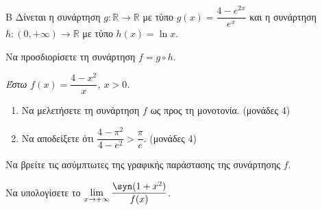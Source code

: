 \begin{thema}{Β}
Δίνεται η συνάρτηση $g: \mathbb{R} \to \mathbb{R}$ με τύπο $g(x) = \dfrac{4 - e^{2x}}{e^x}$ και η συνάρτηση $h: (0, +\infty) \to \mathbb{R}$ με τύπο $h(x) = \ln x$.
\begin{erwthma}
    \item Να προσδιορίσετε τη συνάρτηση $f = g \circ h$. 

    \item[\phantom{Β0.}] \textit{Έστω $f(x) = \dfrac{4 - x^2}{x}$, $x > 0$.}

    \item
    \begin{enumerate}[label=\roman*)]
        \item Να μελετήσετε τη συνάρτηση $f$ ως προς τη μονοτονία. \hfill (μονάδες 4)
        \item Να αποδείξετε ότι $\dfrac{4 - \pi^2}{4 - e^2} > \dfrac{\pi}{e}$. \hfill (μονάδες 4)
    \end{enumerate}

    \item Να βρείτε τις ασύμπτωτες της γραφικής παράστασης της συνάρτησης $f$. 

    \item Να υπολογίσετε το $\displaystyle\lim_{x \to +\infty} \frac{\syn(1 + x^2)}{f(x)}$. 
\end{erwthma}
\end{thema}

